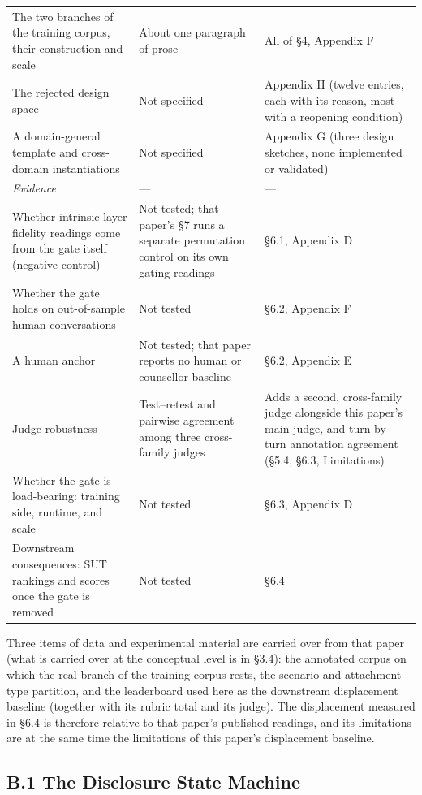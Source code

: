 \documentclass[letterpaper]{article}
\begin{document}
\begin{table}[t]
\begin{tabular}{@{}>{\raggedright\arraybackslash}p{}>{\raggedright\arraybackslash}p{}>{\raggedright\arraybackslash}p{}@{}}
The two branches of the training corpus, their construction and scale & About one paragraph of prose & All of \S{}4, Appendix F \\
The rejected design space & Not specified & Appendix H (twelve entries, each with its reason, most with a reopening condition) \\
A domain-general template and cross-domain instantiations & Not specified & Appendix G (three design sketches, none implemented or validated) \\
\textit{Evidence} & --- & --- \\
Whether intrinsic-layer fidelity readings come from the gate itself (negative control) & Not tested; that paper's \S{}7 runs a separate permutation control on its own gating readings & \S{}6.1, Appendix D \\
Whether the gate holds on out-of-sample human conversations & Not tested & \S{}6.2, Appendix F \\
A human anchor & Not tested; that paper reports no human or counsellor baseline & \S{}6.2, Appendix E \\
Judge robustness & Test--retest and pairwise agreement among three cross-family judges & Adds a second, cross-family judge alongside this paper's main judge, and turn-by-turn annotation agreement (\S{}5.4, \S{}6.3, Limitations) \\
Whether the gate is load-bearing: training side, runtime, and scale & Not tested & \S{}6.3, Appendix D \\
Downstream consequences: SUT rankings and scores once the gate is removed & Not tested & \S{}6.4 \\
\bottomrule
\end{tabular}
\end{table}

Three items of data and experimental material are carried over from that paper (what is carried over at the conceptual level is in \S{}3.4): the annotated corpus on which the real branch of the training corpus rests, the scenario and attachment-type partition, and the leaderboard used here as the downstream displacement baseline (together with its rubric total and its judge). The displacement measured in \S{}6.4 is therefore relative to that paper's published readings, and its limitations are at the same time the limitations of this paper's displacement baseline.





\subsection*{B.1 The Disclosure State Machine}
\end{document}
